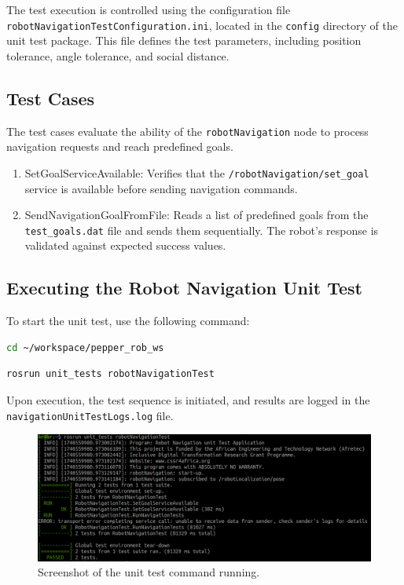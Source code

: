 \documentclass{CSSRforAfrica}
\begin{document}
\noindent The test execution is controlled using the configuration file \texttt{robotNavigationTestConfiguration.ini}, located in the \texttt{config} directory of the unit test package. This file defines the test parameters, including position tolerance, angle tolerance, and social distance.

\subsection{Test Cases}
The test cases evaluate the ability of the \texttt{robotNavigation} node to process navigation requests and reach predefined goals.

\begin{enumerate}
    \item SetGoalServiceAvailable: Verifies that the \texttt{/robotNavigation/set\_goal} service is available before sending navigation commands.
    \item SendNavigationGoalFromFile: Reads a list of predefined goals from the \texttt{test\_goals.dat} file and sends them sequentially. The robot's response is validated against expected success values.
\end{enumerate}

\subsection{Executing the Robot Navigation Unit Test}
To start the unit test, use the following command:

\begin{lstlisting}[style=withoutNumbering, language=bash]
cd ~/workspace/pepper_rob_ws
\end{lstlisting}
\begin{lstlisting}[style=withoutNumbering, language=bash]
rosrun unit_tests robotNavigationTest
\end{lstlisting}
Upon execution, the test sequence is initiated, and results are logged in the \texttt{navigationUnitTestLogs.log} file.
\begin{figure}[H]
    \centering
    \includegraphics[width=\linewidth]{Images/unit-test-terminal.png}
    \caption{Screenshot of the unit test command running.}
    \label{fig:unit_test_terminal}
\end{figure}
\end{document}
